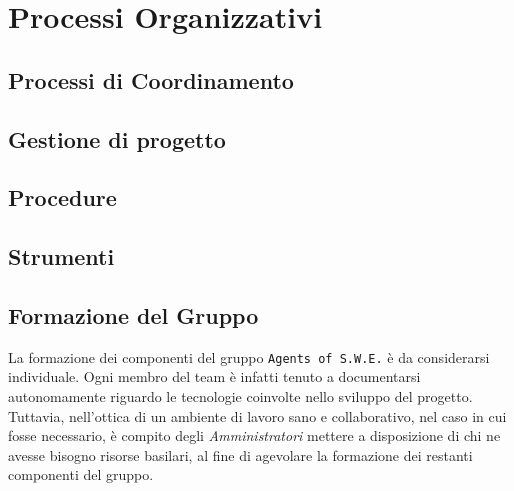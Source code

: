 \section{Processi Organizzativi}\label{ProcessiOrganizzativi}

\subsection{Processi di Coordinamento}\label{ProcessiOrganizzativi_ProcessiCoordinamento}


\subsection{Gestione di progetto}\label{ProcessiOrganizzativi_GestioneProgetto}


\subsection{Procedure}\label{ProcessiOrganizzativi_Procedure}


\subsection{Strumenti}\label{ProcessiOrganizzativi_Strumenti}


\subsection{Formazione del Gruppo}\label{ProcessiOrganizzativi_FormazioneGruppo}
	La formazione dei componenti del gruppo \texttt{Agents of S.W.E.} è da considerarsi individuale. Ogni membro del 			team è infatti tenuto a documentarsi autonomamente riguardo le tecnologie coinvolte nello sviluppo del 								progetto\glossario. Tuttavia, nell'ottica di un ambiente di lavoro sano e collaborativo, nel caso in cui fosse 				necessario, è compito degli \textit{Amministratori} mettere a disposizione di chi ne avesse bisogno risorse 						basilari, al fine di	agevolare la formazione dei restanti componenti del gruppo.
